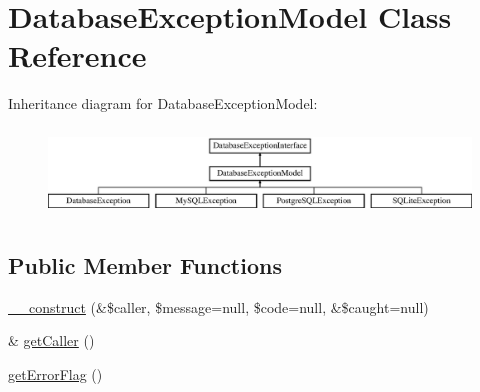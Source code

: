 \hypertarget{class_database_exception_model}{}\section{Database\+Exception\+Model Class Reference}
\label{class_database_exception_model}
Inheritance diagram for Database\+Exception\+Model\+:\begin{figure}[H]
\begin{center}
\leavevmode
\includegraphics[height=2.359551cm]{class_database_exception_model}
\end{center}
\end{figure}
\subsection*{Public Member Functions}
\begin{DoxyCompactItemize}
\item 
\hyperlink{class_database_exception_model_ad1f01ac86a6ae06c72165c3a7cb0424a}{\+\_\+\+\_\+construct} (\&\$caller, \$message=null, \$code=null, \&\$caught=null)
\item 
\& \hyperlink{class_database_exception_model_aedb1e2149e60e99bd62a64f5533c7903}{get\+Caller} ()
\item 
\hyperlink{class_database_exception_model_aaf4fb3a4978596f9e37fdbdd1e786082}{get\+Error\+Flag} ()
\end{DoxyCompactItemize}
